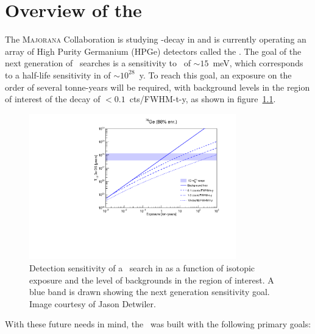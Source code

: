 \documentclass[/main.tex]{subfiles}
\begin{document}
\graphicspath{{./pics/}{ch2/pics/}}

\onlyinsubfile{\textpages}
\chapter{Overview of the \MJD}

The \textsc{Majorana} Collaboration is studying \bb -decay in  and is currently operating an array of High Purity Germanium (HPGe) detectors called the \MJD\cite{mjd2014}.
The goal of the next generation of \znbb\ searches is a sensitivity to \mbb\ of $\sim15$~meV, which corresponds to a half-life sensitivity in  of $\sim10^{28}$~y.
To reach this goal, an exposure on the order of several tonne-years will be required, with background levels in the region of interest of the decay of $<0.1$~cts/FWHM-t-y, as shown in figure~\ref{fig:sensitivity}.
\begin{figure}[h]
  \centering
  \includegraphics[width=0.8\textwidth]{sensitivityplot}
  \caption[Detection sensitivity to \znbb\ in ]{\label{fig:sensitivity}
    Detection sensitivity of a \znbb\ search in  as a function of isotopic exposure and the level of backgrounds in the region of interest. A blue band is drawn showing the next generation sensitivity goal. Image courtesy of Jason Detwiler.
  }
\end{figure}
With these future needs in mind, the \MJD\ was built with the following primary goals:
\end{document}
